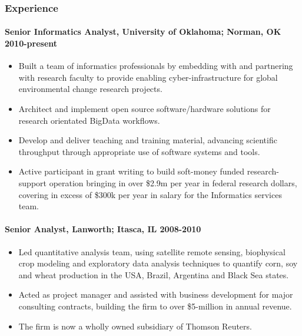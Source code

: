 \subsubsection{Experience}\label{experience}

\paragraph{Senior Informatics Analyst, University of Oklahoma; Norman,
OK
\textbf{2010-present}}\label{senior-informatics-analyst-university-of-oklahoma-norman-ok-2010-present}

\begin{itemize}
\itemsep1pt\parskip0pt
\item
  Built a team of informatics professionals by embedding with and
  partnering with research faculty to provide enabling
  cyber-infrastructure for global environmental change research
  projects.
\item
  Architect and implement open source software/hardware solutions for
  research orientated BigData workflows.
\item
  Develop and deliver teaching and training material, advancing
  scientific throughput through appropriate use of software systems and
  tools.
\item
  Active participant in grant writing to build soft-money funded
  research-support operation bringing in over \$2.9m per year in federal
  research dollars, covering in excess of \$300k per year in salary for
  the Informatics services team.
\end{itemize}

\paragraph{Senior Analyst, Lanworth; Itasca, IL
\textbf{2008-2010}}\label{senior-analyst-lanworth-itasca-il-2008-2010}

\begin{itemize}
\itemsep1pt\parskip0pt
\item
  Led quantitative analysis team, using satellite remote sensing,
  biophysical crop modeling and exploratory data analysis techniques to
  quantify corn, soy and wheat production in the USA, Brazil, Argentina
  and Black Sea states.
\item
  Acted as project manager and assisted with business development for
  major consulting contracts, building the firm to over \$5-million in
  annual revenue.
\item
  The firm is now a wholly owned subsidiary of Thomson Reuters.
\end{itemize}

